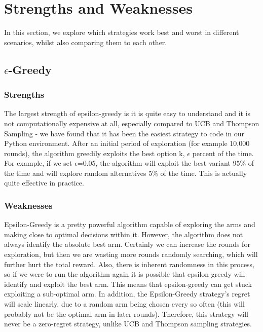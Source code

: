 \section{Strengths and Weaknesses}\label{sec:strengths-and-weaknesses}
In this section, we explore which strategies work best and worst in different scenarios, whilst also comparing them to each other.

\subsection{$\epsilon$-Greedy}\label{subsec:$epsilon$-greedy}

\subsubsection{Strengths}
The largest strength of epsilon-greedy is it is quite easy to understand and it is not computationally expensive at all, especially compared to UCB and Thompson Sampling - we have found that it has been the easiest strategy to code in our Python environment. After an initial period of exploration (for example 10,000 rounds), the algorithm greedily exploits the best option k, $\epsilon$ percent of the time. For example, if we set $\epsilon$=0.05, the algorithm will exploit the best variant 95\% of the time and will explore random alternatives 5\% of the time. This is actually quite effective in practice.

\subsubsection{Weaknesses}
Epsilon-Greedy is a pretty powerful algorithm capable of exploring the arms and making close to optimal decisions within it. However, the algorithm does not always identify the absolute best arm. Certainly we can increase the rounds for exploration, but then we are wasting more rounds randomly searching, which will further hurt the total reward. Also, there is inherent randomness in this process, so if we were to run the algorithm again it is possible that epsilon-greedy will identify and exploit the best arm. This means that epsilon-greedy can get stuck exploiting a sub-optimal arm. 
\newline
In addition, the Epsilon-Greedy strategy's regret will scale linearly, due to a random arm being chosen every so often (this will probably not be the optimal arm in later rounds). Therefore, this strategy will never be a zero-regret strategy, unlike UCB and Thompson sampling strategies.

